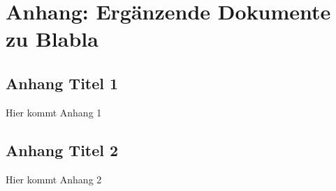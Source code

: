 \section{Anhang: Ergänzende Dokumente zu Blabla}

\subsection*{Anhang Titel 1}
\label{sec:anhang-1}
Hier kommt Anhang 1
\pagebreak

\subsection*{Anhang Titel 2}
\label{sec:anhang-2}
Hier kommt Anhang 2
\pagebreak
